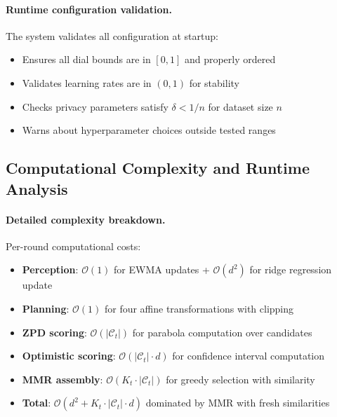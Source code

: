 \paragraph{Runtime configuration validation.} The system validates all configuration at startup:
\begin{itemize}
  \item Ensures all dial bounds are in $[0,1]$ and properly ordered
  \item Validates learning rates are in $(0,1)$ for stability
  \item Checks privacy parameters satisfy $\delta < 1/n$ for dataset size $n$
  \item Warns about hyperparameter choices outside tested ranges
\end{itemize}

\subsection{Computational Complexity and Runtime Analysis}
\label{app:complexity-detailed}

\paragraph{Detailed complexity breakdown.} Per-round computational costs:
\begin{itemize}
  \item \textbf{Perception}: $\mathcal{O}(1)$ for EWMA updates + $\mathcal{O}(d^2)$ for ridge regression update
  \item \textbf{Planning}: $\mathcal{O}(1)$ for four affine transformations with clipping
  \item \textbf{ZPD scoring}: $\mathcal{O}(|\mathcal{C}_t|)$ for parabola computation over candidates
  \item \textbf{Optimistic scoring}: $\mathcal{O}(|\mathcal{C}_t| \cdot d)$ for confidence interval computation
  \item \textbf{MMR assembly}: $\mathcal{O}(K_t \cdot |\mathcal{C}_t|)$ for greedy selection with similarity
  \item \textbf{Total}: $\mathcal{O}(d^2 + K_t \cdot |\mathcal{C}_t| \cdot d)$ dominated by MMR with fresh similarities
\end{itemize}

